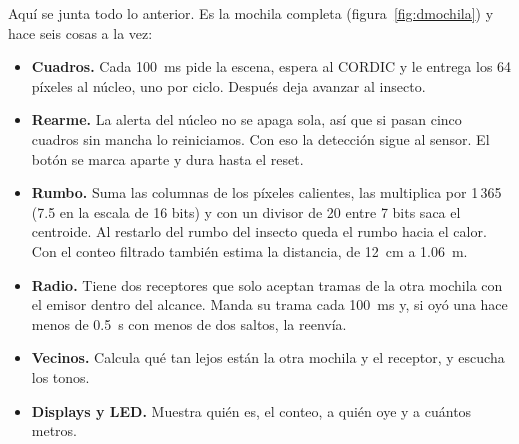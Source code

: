 Aquí se junta todo lo anterior. Es la mochila completa (figura~\ref{fig:dmochila}) y hace seis cosas a la vez:
\begin{itemize}
  \item \textbf{Cuadros.} Cada 100~ms pide la escena, espera al CORDIC y le entrega los 64 píxeles al núcleo, uno por ciclo. Después
        deja avanzar al insecto.
  \item \textbf{Rearme.} La alerta del núcleo no se apaga sola, así que si pasan cinco cuadros sin mancha lo reiniciamos. Con eso la
        detección sigue al sensor. El botón se marca aparte y dura hasta el reset.
  \item \textbf{Rumbo.} Suma las columnas de los píxeles calientes, las multiplica por 1\,365 (7.5\textdegree{} en la escala de 16
        bits) y con un divisor de 20 entre 7 bits saca el centroide. Al restarlo del rumbo del insecto queda el rumbo hacia el calor.
        Con el conteo filtrado también estima la distancia, de 12~cm a 1.06~m.
  \item \textbf{Radio.} Tiene dos receptores que solo aceptan tramas de la otra mochila con el emisor dentro del alcance. Manda su
        trama cada 100~ms y, si oyó una hace menos de 0.5~s con menos de dos saltos, la reenvía.
  \item \textbf{Vecinos.} Calcula qué tan lejos están la otra mochila y el receptor, y escucha los tonos.
  \item \textbf{Displays y LED.} Muestra quién es, el conteo, a quién oye y a cuántos metros.
\end{itemize}

